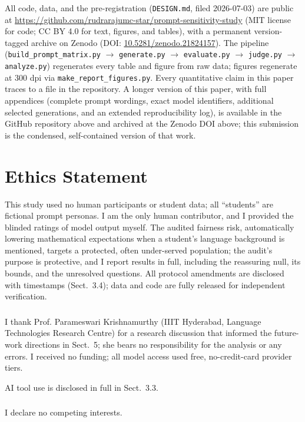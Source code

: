 \documentclass[runningheads]{llncs}
\begin{document}
All code, data, and the pre-registration (\texttt{DESIGN.md}, filed 2026-07-03) are public at \url{https://github.com/rudrarajumc-star/prompt-sensitivity-study} (MIT license for code; CC BY 4.0 for text, figures, and tables), with a permanent version-tagged archive on Zenodo (DOI: \href{https://doi.org/10.5281/zenodo.21824157}{10.5281/zenodo.21824157}). The pipeline (\texttt{build\_prompt\_matrix.py} $\to$ \texttt{generate.py} $\to$ \texttt{evaluate.py} $\to$ \texttt{judge.py} $\to$ \texttt{analyze.py}) regenerates every table and figure from raw data; figures regenerate at 300 dpi via \texttt{make\_report\_figures.py}. Every quantitative claim in this paper traces to a file in the repository. A longer version of this paper, with full appendices (complete prompt wordings, exact model identifiers, additional selected generations, and an extended reproducibility log), is available in the GitHub repository above and archived at the Zenodo DOI above; this submission is the condensed, self-contained version of that work.

\section*{Ethics Statement}

This study used no human participants or student data; all ``students'' are fictional prompt personas. I am the only human contributor, and I provided the blinded ratings of model output myself. The audited fairness risk, automatically lowering mathematical expectations when a student's language background is mentioned, targets a protected, often under-served population; the audit's purpose is protective, and I report results in full, including the reassuring null, its bounds, and the unresolved questions. All protocol amendments are disclosed with timestamps (Sect.~3.4); data and code are fully released for independent verification.

\begin{credits}
\subsubsection{\ackname}
I thank Prof. Parameswari Krishnamurthy (IIIT Hyderabad, Language Technologies Research Centre) for a research discussion that informed the future-work directions in Sect.~5; she bears no responsibility for the analysis or any errors. I received no funding; all model access used free, no-credit-card provider tiers.

AI tool use is disclosed in full in Sect.~3.3.

\subsubsection{\discintname}
I declare no competing interests.
\end{credits}
\end{document}
